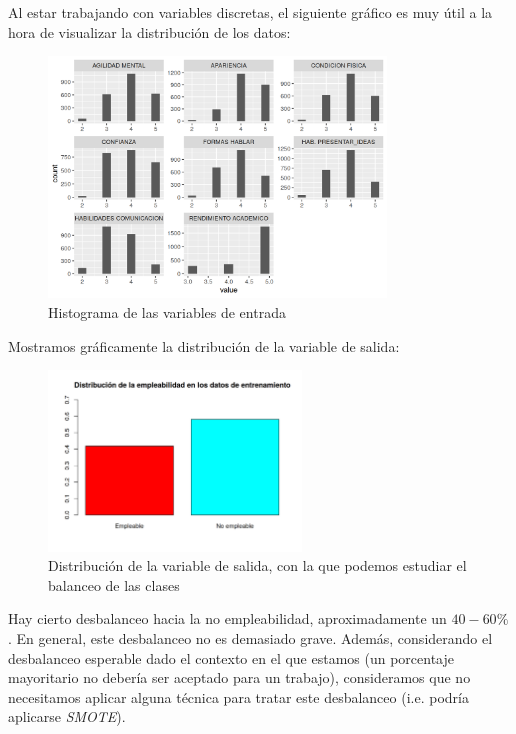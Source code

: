 \documentclass[11pt]{article}
\begin{document}
Al estar trabajando con variables discretas, el siguiente gráfico es muy útil a la hora de visualizar la distribución de los datos:

\begin{figure}[H]
    \centering
    \includegraphics[width=0.8\textwidth]{histogramas_variables}
    \caption{Histograma de las variables de entrada}
\end{figure}

Mostramos gráficamente la distribución de la variable de salida:

\begin{figure}[H]
    \centering
    \includegraphics[width=0.6\textwidth]{balanceo_clases}
    \caption{Distribución de la variable de salida, con la que podemos estudiar el balanceo de las clases}
\end{figure}


Hay cierto desbalanceo hacia la no empleabilidad, aproximadamente un $40-60\%$. En general, este desbalanceo no es demasiado grave. Además, considerando el desbalanceo esperable dado el contexto en el que estamos (un porcentaje mayoritario no debería ser aceptado para un trabajo), consideramos que no necesitamos aplicar alguna técnica para tratar este desbalanceo (i.e. podría aplicarse \textit{SMOTE}).
\end{document}
